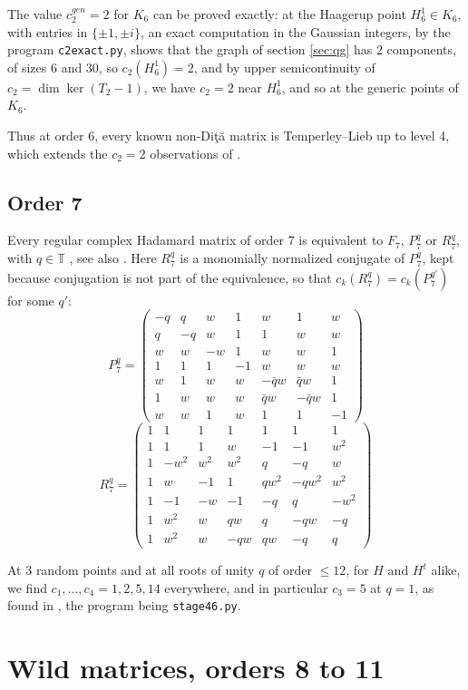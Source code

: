 \documentclass[11pt]{amsart}
\newcommand{\T}{\mathbb T}
\begin{document}
\noindent The value $c_2^{gen}=2$ for $K_6$ can be proved exactly: at the Haagerup point $H_6^1\in K_6$, with entries in $\{\pm1,\pm i\}$, an exact computation in the Gaussian integers, by the program \texttt{c2exact.py}, shows that the graph of section \ref{sec:qg} has 2 components, of sizes 6 and 30, so $c_2(H_6^1)=2$, and by upper semicontinuity of $c_2=\dim\ker(T_2-1)$, we have $c_2=2$ near $H_6^1$, and so at the generic points of $K_6$.

\noindent Thus at order 6, every known non-Di\c t\u a matrix is Temperley--Lieb up to level 4, which extends the $c_2=2$ observations of \cite{cn}.

\subsection{Order 7}

Every regular complex Hadamard matrix of order 7 is equivalent to $F_7$, $P_7^q$ or $R_7^q$, with $q\in\T$ \cite{gt}, see also \cite{pet}. Here $R_7^q$ is a monomially normalized conjugate of $P_7^q$, kept because conjugation is not part of the equivalence, so that $c_k(R_7^q)=c_k(P_7^{q'})$ for some $q'$:
$$P_7^q=\begin{pmatrix}
-q&q&w&1&w&1&w\\
q&-q&w&1&1&w&w\\
w&w&-w&1&w&w&1\\
1&1&1&-1&w&w&w\\
w&1&w&w&-\bar{q}w&\bar{q}w&1\\
1&w&w&w&\bar{q}w&-\bar{q}w&1\\
w&w&1&w&1&1&-1
\end{pmatrix}$$
$$R_7^q=\begin{pmatrix}
1&1&1&1&1&1&1\\
1&1&1&w&-1&-1&w^2\\
1&-w^2&w^2&w^2&q&-q&w\\
1&w&-1&1&qw^2&-qw^2&w^2\\
1&-1&-w&-1&-q&q&-w^2\\
1&w^2&w&qw&q&-qw&-q\\
1&w^2&w&-qw&qw&-q&q
\end{pmatrix}$$

\noindent At 3 random points and at all roots of unity $q$ of order $\leq12$, for $H$ and $H^t$ alike, we find $c_1,\ldots,c_4=1,2,5,14$ everywhere, and in particular $c_3=5$ at $q=1$, as found in \cite{cn}, the program being \texttt{stage46.py}.

\section{Wild matrices, orders 8 to 11}\label{sec:wild8}
\end{document}
